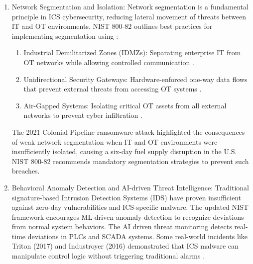 \begin{enumerate}
    \begin{enumerate}
        \item Network Segmentation and Isolation: Network segmentation is a fundamental principle in ICS cybersecurity, reducing lateral movement of threats between IT and OT environments. NIST 800-82 outlines best practices for implementing segmentation using \cite{kallatsa2024strategies}:
        \begin{enumerate}   
            \item Industrial Demilitarized Zones (IDMZs): Separating enterprise IT from OT networks while allowing controlled communication \cite{mazur2016defining}.
            \item Unidirectional Security Gateways: Hardware-enforced one-way data flows that prevent external threats from accessing OT systems \cite{heo2016design}.
            \item Air-Gapped Systems: Isolating critical OT assets from all external networks to prevent cyber infiltration \cite{guri2023air}.
        \end{enumerate}
        The 2021 Colonial Pipeline ransomware attack highlighted the consequences of weak network segmentation when IT and OT environments were insufficiently isolated, causing a six-day fuel supply disruption in the U.S. NIST 800-82 recommends mandatory segmentation strategies to prevent such breaches.
        \item Behavioral Anomaly Detection and AI-driven Threat Intelligence: Traditional signature-based Intrusion Detection Systems (IDS) have proven insufficient against zero-day vulnerabilities and ICS-specific malware. The updated NIST framework encourages ML driven anomaly detection to recognize deviations from normal system behaviors. The AI driven threat monitoring detects real-time deviations in PLCs and SCADA systems. Some real-world incidents like Triton (2017) \cite{myung2019ics} and Industroyer (2016) \cite{makrakis2021vulnerabilities} demonstrated that ICS malware can manipulate control logic without triggering traditional alarms \cite{firoozjaei2022evaluation}.    

    \end{enumerate}
    
\end{enumerate}
